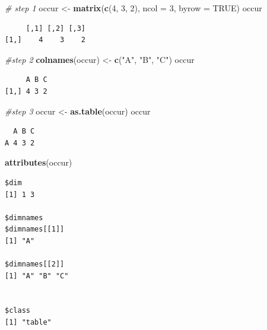 \documentclass[]{book}
\newenvironment{Shaded}{\begin{snugshade}}{\end{snugshade}}
\newcommand{\CommentTok}[1]{\textcolor[rgb]{0.56,0.35,0.01}{\textit{#1}}}
\newcommand{\DataTypeTok}[1]{\textcolor[rgb]{0.13,0.29,0.53}{#1}}
\newcommand{\DecValTok}[1]{\textcolor[rgb]{0.00,0.00,0.81}{#1}}
\newcommand{\KeywordTok}[1]{\textcolor[rgb]{0.13,0.29,0.53}{\textbf{#1}}}
\newcommand{\NormalTok}[1]{#1}
\newcommand{\OtherTok}[1]{\textcolor[rgb]{0.56,0.35,0.01}{#1}}
\newcommand{\StringTok}[1]{\textcolor[rgb]{0.31,0.60,0.02}{#1}}
\theoremstyle{definition}
\theoremstyle{definition}
\theoremstyle{definition}
\theoremstyle{remark}
\begin{document}
\begin{Shaded}
\begin{Highlighting}[]
\CommentTok{# step 1}
\NormalTok{occur <-}\StringTok{ }\KeywordTok{matrix}\NormalTok{(}\KeywordTok{c}\NormalTok{(}\DecValTok{4}\NormalTok{, }\DecValTok{3}\NormalTok{, }\DecValTok{2}\NormalTok{), }\DataTypeTok{ncol =} \DecValTok{3}\NormalTok{, }\DataTypeTok{byrow =} \OtherTok{TRUE}\NormalTok{)}
\NormalTok{occur}
\end{Highlighting}
\end{Shaded}

\begin{verbatim}
     [,1] [,2] [,3]
[1,]    4    3    2
\end{verbatim}

\begin{Shaded}
\begin{Highlighting}[]
\CommentTok{#step 2}
\KeywordTok{colnames}\NormalTok{(occur) <-}\StringTok{ }\KeywordTok{c}\NormalTok{(}\StringTok{"A"}\NormalTok{, }\StringTok{"B"}\NormalTok{, }\StringTok{"C"}\NormalTok{)}
\NormalTok{occur}
\end{Highlighting}
\end{Shaded}

\begin{verbatim}
     A B C
[1,] 4 3 2
\end{verbatim}

\begin{Shaded}
\begin{Highlighting}[]
\CommentTok{#step 3}
\NormalTok{occur <-}\StringTok{ }\KeywordTok{as.table}\NormalTok{(occur)}
\NormalTok{occur}
\end{Highlighting}
\end{Shaded}

\begin{verbatim}
  A B C
A 4 3 2
\end{verbatim}

\begin{Shaded}
\begin{Highlighting}[]
\KeywordTok{attributes}\NormalTok{(occur)}
\end{Highlighting}
\end{Shaded}

\begin{verbatim}
$dim
[1] 1 3

$dimnames
$dimnames[[1]]
[1] "A"

$dimnames[[2]]
[1] "A" "B" "C"


$class
[1] "table"
\end{verbatim}
\end{document}
